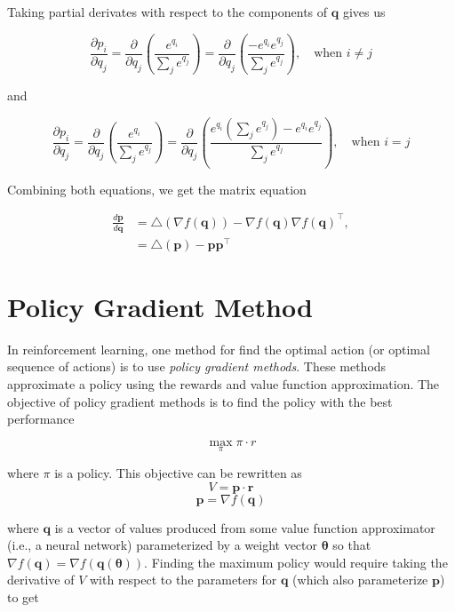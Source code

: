 \documentclass[10pt]{article}
\theoremstyle{definition}
\begin{document}
\noindent
Taking partial derivates with respect to the components of $\mathbf{q}$ gives us

$$
\frac{\partial p_i}{\partial q_j} = \frac{\partial}{\partial q_j} \left(\frac{e^{q_i}}{\sum_j e^{q_j}} \right) = \frac{\partial}{\partial q_j} \left(\frac{-e^{q_i}e^{q_j}}{\sum_j e^{q_j}} \right), \quad \text{when $i\neq j$}
$$

\noindent
and

$$
\frac{\partial p_i}{\partial q_j} = \frac{\partial}{\partial q_j} \left(\frac{e^{q_i}}{\sum_j e^{q_j}} \right) = \frac{\partial}{\partial q_j} \left(\frac{e^{q_i}(\sum_j e^{q_j})-e^{q_i}e^{q_j}}{\sum_j e^{q_j}} \right), \quad \text{when $i=j$}
$$

\noindent
Combining both equations, we get the matrix equation

\begin{equation*}
\begin{aligned}
\frac{d\mathbf{p}}{d\mathbf{q}} & = \triangle(\nabla f(\mathbf{q})) - \nabla f(\mathbf{q})\nabla f(\mathbf{q})^\top, \\
& = \triangle(\mathbf{p}) - \mathbf{p}\mathbf{p}^\top
\end{aligned}
\end{equation*}

\section*{Policy Gradient Method}

In reinforcement learning, one method for find the optimal action (or optimal sequence of actions) is to use \emph{policy gradient methods}. These methods approximate a policy using the rewards and value function approximation. The objective of policy gradient methods is to find the policy with the best performance

$$
\max_{\pi} \pi \cdot r
$$

\noindent
where $\pi$ is a policy. This objective can be rewritten as
$$
V = \mathbf{p} \cdot \mathbf{r}
$$
$$
\mathbf{p} = \nabla f(\mathbf{q})
$$

\noindent
where $\mathbf{q}$ is a vector of values produced from some value function approximator (i.e., a neural network) parameterized by a weight vector $\pmb{\theta}$ so that $\nabla f(\mathbf{q}) = \nabla f(\mathbf{q}(\pmb{\theta}))$. Finding the maximum policy would require taking the derivative of $V$ with respect to the parameters for $\mathbf{q}$ (which also parameterize $\mathbf{p}$) to get
\end{document}
